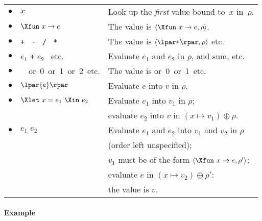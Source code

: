 \begin{tabular}{@{}rll@{}}
    $\bullet$
  & $x$
  & Look up the \emph{first} value bound to~\(x\) in~\(\rho\).\\[2mm]
    $\bullet$
  & $\Xfun \,\, x \rightarrow e$
  & The value is $\langle\Xfun \,\, x \rightarrow e, \rho\rangle$.\\[2mm]
    $\bullet$
  & \texttt{+} \ \texttt{-} \ \texttt{/} \ \texttt{*}
  & The value is $\langle\lpar\texttt{+}\rpar, \rho\rangle$ etc.\\[2mm]
    $\bullet$
  & $e_1$ \texttt{+} $e_2$ \ etc.
  & Evaluate $e_1$ and $e_2$ in $\rho$, and sum, etc.\\[2mm]
    $\bullet$
  & \unit \ or \textsf{0} or \textsf{1} or \textsf{2} etc.
  & The value is \unit or \textsf{0} or \textsf{1} etc.\\[2mm]
    $\bullet$
  & $\lpar{e}\rpar$
  & Evaluate $e$ into $v$ in $\rho$.\\[2mm]
    $\bullet$
  & $\Xlet \,\, x = e_1 \,\, \Xin \,\, e_2$
  & Evaluate $e_1$ into $v_1$ in $\rho$;\\
  &
  & evaluate $e_2$ into $v$ in $(x \mapsto v_1) \oplus \rho$.\\[2mm]
    $\bullet$
  & $e_1 \,\, e_2$
  & Evaluate $e_1$ and $e_2$ into $v_1$ and $v_2$ in $\rho$\\
  &
  & (order left unspecified);\\
  &
  & $v_1$ must be of the form $\langle\Xfun \,\, x \rightarrow
    e,\rho'\rangle$;\\
  &
  & evaluate $e$ in $(x \mapsto v_2) \oplus \rho'$:\\
  && the value is $v$.
\end{tabular}

\bigskip

\paragraph{Example}


